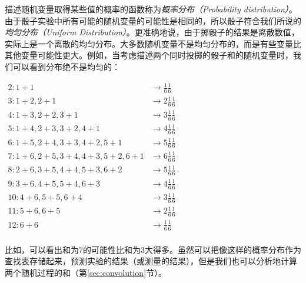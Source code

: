 描述随机变量取得某些值的概率的函数称为\emph{概率分布（Probability distribution）}。
由于骰子实验中所有可能的随机变量的可能性是相同的，所以骰子符合我们所说的\emph{均匀分布（Uniform Distribution）}。更准确地说，由于掷骰子的结果是离散数值，实际上是一个离散的均匀分布。大多数随机变量不是均匀分布的，而是有些变量比其他变量可能性更大。例如，当考虑描述两个同时投掷的骰子和的随机变量时，我们可以看到分布绝不是均匀的：

$\begin{array}{ll}
2: 1+1 & \rightarrow \frac{1}{6}\frac{1}{6}\\
3: 1+2, 2+1 &\rightarrow 2\frac{1}{6}\frac{1}{6}\\
4: 1+3, 2+2, 3+1 &\rightarrow 3\frac{1}{6}\frac{1}{6}\\
5: 1+4, 2+3, 3+2, 4+1 & \rightarrow 4\frac{1}{6}\frac{1}{6}\\
6: 1+5, 2+4, 3+3, 4+2, 5+1 & \rightarrow 5\frac{1}{6}\frac{1}{6}\\
7: 1+6, 2+5, 3+4, 4+3, 5+2, 6+1 & \rightarrow 6\frac{1}{6}\frac{1}{6}\\
8: 2+6, 3+5, 4+4, 5+3, 6+2 & \rightarrow 5\frac{1}{6}\frac{1}{6}\\
9: 3+6, 4+5, 5+4, 6+3 & \rightarrow 4\frac{1}{6}\frac{1}{6}\\
10: 4+6, 5+5, 6+4 & \rightarrow 3\frac{1}{6}\frac{1}{6}\\
11: 5+6, 6+5 & \rightarrow 2\frac{1}{6}\frac{1}{6}\\
12: 6+6 & \rightarrow \frac{1}{6}\frac{1}{6}\\
\end{array}$


比如，可以看出和为7的可能性比和为3大得多。虽然可以把像这样的概率分布作为查找表存储起来，预测实验的结果（或测量的结果），但是我们也可以分析地计算两个随机过程的和（第\ref{sec:convolution}节）。


